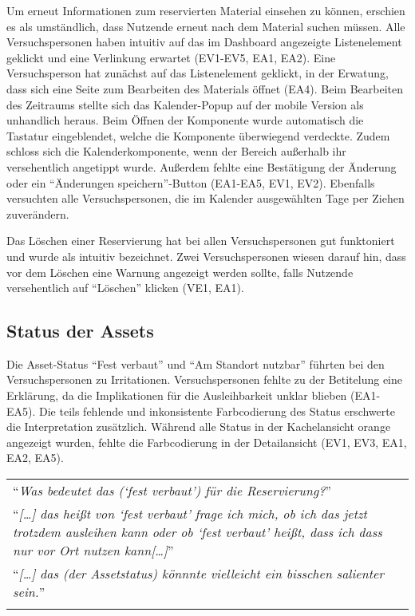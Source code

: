 Um erneut Informationen zum reservierten Material einsehen zu können, erschien es als umständlich,
dass Nutzende erneut nach dem Material suchen müssen. Alle Versuchspersonen haben intuitiv auf das
im Dashboard angezeigte Listenelement geklickt und eine Verlinkung erwartet (EV1-EV5, EA1, EA2).
Eine Versuchsperson hat zunächst auf das Listenelement geklickt, in der Erwatung, dass sich eine
Seite zum Bearbeiten des Materials öffnet (EA4). Beim Bearbeiten des Zeitraums stellte sich das
Kalender-Popup auf der mobile Version als unhandlich heraus. Beim Öffnen der Komponente wurde
automatisch die Tastatur eingeblendet, welche die Komponente überwiegend verdeckte. Zudem schloss
sich die Kalenderkomponente, wenn der Bereich außerhalb ihr versehentlich angetippt wurde. Außerdem
fehlte eine Bestätigung der Änderung oder ein \enquote{Änderungen speichern}-Button (EA1-EA5, EV1,
EV2). Ebenfalls versuchten alle Versuchspersonen, die im Kalender ausgewählten Tage per Ziehen
zuverändern.

Das Löschen einer Reservierung hat bei allen Versuchspersonen gut funktoniert
und wurde als intuitiv bezeichnet. Zwei Versuchspersonen wiesen darauf hin, dass vor dem
Löschen eine Warnung angezeigt werden sollte, falls Nutzende versehentlich auf \enquote{Löschen}
klicken (VE1, EA1).


\subsection{Status der Assets}
Die Asset-Status \enquote{Fest verbaut} und \enquote{Am Standort nutzbar} führten bei den
Versuchspersonen zu Irritationen. Versuchspersonen fehlte zu der Betitelung eine Erklärung, da die
Implikationen für die Ausleihbarkeit unklar blieben (EA1-EA5). Die teils fehlende und inkonsistente
Farbcodierung des Status erschwerte die Interpretation zusätzlich. Während alle Status in der
Kachelansicht orange angezeigt wurden, fehlte die Farbcodierung in der Detailansicht (EV1, EV3, EA1,
EA2, EA5).

\begin{longtable}{p{}} \arrayrulecolor{maincolor}\hline
  \enquote{\textit{Was bedeutet das (\enquote{fest verbaut}) für die Reservierung?}} \\
  \enquote{\textit{[\dots] das heißt von \enquote{fest verbaut} frage ich mich,
      ob ich das jetzt trotzdem ausleihen kann oder ob \enquote{fest verbaut} heißt,
  dass ich dass nur vor Ort nutzen kann[\dots]}}            \\
  \enquote{\textit{[\dots] das (der Assetstatus) könnnte vielleicht ein bisschen
  salienter sein.}}                                         \\
  \arrayrulecolor{maincolor}\hline
\end{longtable}



